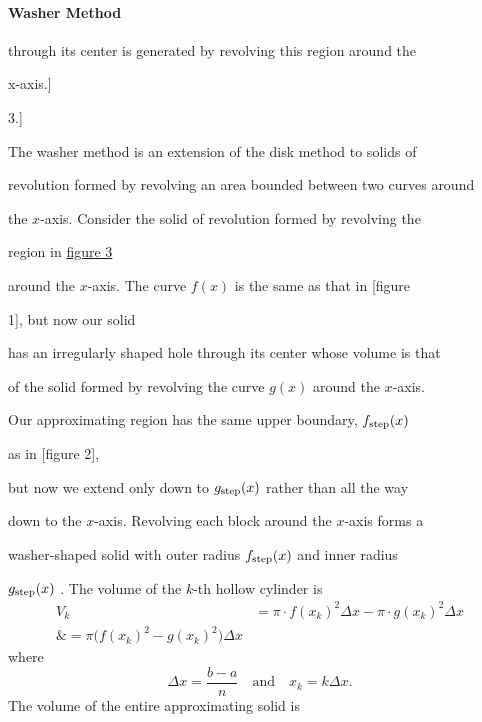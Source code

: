 \paragraph{Washer Method}




through its center is generated by revolving this region around the

x-axis.]


3.]



The washer method is an extension of the disk method to solids of

revolution formed by revolving an area bounded between two curves around

the $x$-axis. Consider the solid of revolution formed by revolving the

region in \href{:File:Generating_fxs_washer_method.svg "wikilink"}{figure 3}

around the $x$-axis. The curve $f(x)$ is the same as that in [figure

1], but now our solid

has an irregularly shaped hole through its center whose volume is that

of the solid formed by revolving the curve $g(x)$ around the $x$-axis.

Our approximating region has the same upper boundary, $f _{\rm step}(x)$

as in [figure 2],

but now we extend only down to $g _{\rm step}(x)$ rather than all the way

down to the $x$-axis. Revolving each block around the $x$-axis forms a

washer-shaped solid with outer radius $f_ {\rm step}(x)$ and inner radius

$g_ {\rm step}(x)$ . The volume of the $k$-th hollow cylinder is
\begin{align}
V _k &= \pi\cdot f(x _k)^2 \Delta x - \pi\cdot g(x _k)^2 \Delta x \\\&= \pi\bigl(f(x _k)^2 - g(x _k)^2\bigr)\Delta x
\end{align}
where 
$$
\Delta x = \frac{b-a}{n} \quad \text{and} \quad x _k = k\Delta x.
$$
The volume of the entire approximating solid is



